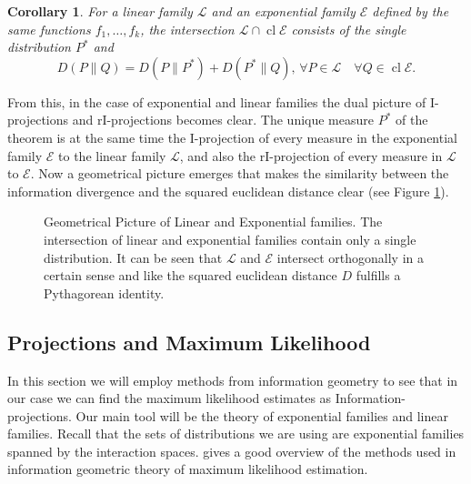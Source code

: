 \documentclass[12pt]{amsart}
\DeclareMathOperator*{\cl}{cl}
\theoremstyle{plain}%
\newtheorem*{cor}{Corollary}
\theoremstyle{definition}
\theoremstyle{remark}
\begin{document}
\begin{cor}
  For a linear family $\mathcal{L}$ and an exponential family
  $\mathcal{E}$ defined by the same functions $f_1,\ldots,f_k$, the
  intersection $\mathcal{L}\cap\cl\mathcal{E}$ consists of the single
  distribution $P^*$ and
  \begin{equation*}
    \label{eq:pythagoreanidentity2}
    D(P\parallel Q) = D(P\parallel P^*) + 
    D(P^*\parallel Q),\, \forall P \in \mathcal{L} \quad \forall Q\in\cl\mathcal{E}.
  \end{equation*}
\end{cor}
From this, in the case of exponential and linear families the dual
picture of I-projections and rI-projections becomes clear. The unique
measure $P^*$ of the theorem is at the same time the I-projection of
every measure in the exponential family $\mathcal{E}$ to the linear
family $\mathcal{L}$, and also the rI-projection of every measure in
$\mathcal{L}$ to $\mathcal{E}$. Now a geometrical picture emerges that
makes the similarity between the information divergence and the
squared euclidean distance clear (see Figure
\ref{fig:pythagoreanfigure}).
\begin{figure}[htbp]
  \centering
   
  \caption{Geometrical Picture of Linear and Exponential families. The
    intersection of linear and exponential families contain only a
    single distribution. It can be seen that $\mathcal{L}$ and
    $\mathcal{E}$ intersect orthogonally in a certain sense and like
    the squared euclidean distance $D$ fulfills a Pythagorean
    identity. }
  \label{fig:pythagoreanfigure}
\end{figure}

\subsection{Projections and Maximum Likelihood}
In this section we will employ methods from information geometry to
see that in our case we can find the maximum likelihood estimates as
Information-projections. Our main tool will be the theory of
exponential families and linear families. Recall that the sets of
distributions we are using are exponential families spanned by the
interaction spaces. \cite{csiszarshields04} gives a good overview of
the methods used in information geometric theory of maximum likelihood
estimation.
\end{document}
